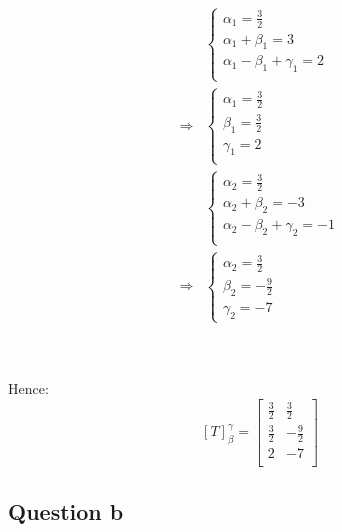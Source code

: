 \documentclass{article}
\begin{document}
\begin{equation*}
\begin{split}
&\begin{cases}
\alpha_1=\frac{3}{2}\\
\alpha_1+\beta_1=3\\
\alpha_1-\beta_1+\gamma_1=2\\
\end{cases}\\
\Rightarrow &\begin{cases}
\alpha_1=\frac{3}{2}\\
\beta_1=\frac{3}{2}\\
\gamma_1=2\\
\end{cases}\\
&\begin{cases}
\alpha_2=\frac{3}{2}\\
\alpha_2+\beta_2=-3\\
\alpha_2-\beta_2+\gamma_2=-1\\
\end{cases}\\
\Rightarrow &\begin{cases}
\alpha_2=\frac{3}{2}\\
\beta_2=-\frac{9}{2}\\
\gamma_2=-7
\end{cases}\\
\end{split}
\end{equation*}

~

Hence:
$$
\left[T\right]^\gamma_\beta=\begin{bmatrix}
\frac{3}{2}&\frac{3}{2}\\
\frac{3}{2}&-\frac{9}{2}\\
2&-7\\
\end{bmatrix}
$$

\subsection{Question b}
\end{document}
